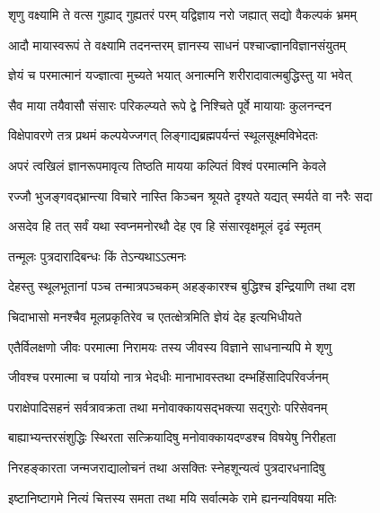 


\addtocounter{shlokacount}{18}

\twolineshloka
{शृणु वक्ष्यामि ते वत्स गुह्याद् गुह्यतरं परम्}
{यद्विज्ञाय नरो जह्यात् सद्यो वैकल्पकं भ्रमम्} %

\twolineshloka
{आदौ मायास्वरूपं ते वक्ष्यामि तदनन्तरम्}
{ज्ञानस्य साधनं पश्चाज्ज्ञानविज्ञानसंयुतम्} %

\twolineshloka
{ज्ञेयं च परमात्मानं यज्ज्ञात्वा मुच्यते भयात्}
{अनात्मनि शरीरादावात्मबुद्धिस्तु या भवेत्} %

\twolineshloka
{सैव माया तयैवासौ संसारः परिकल्प्यते}
{रूपे द्वे निश्चिते पूर्वे मायायाः कुलनन्दन} %

\twolineshloka
{विक्षेपावरणे तत्र प्रथमं कल्पयेज्जगत्}
{लिङ्गाद्यब्रह्मपर्यन्तं स्थूलसूक्ष्मविभेदतः} %

\twolineshloka
{अपरं त्वखिलं ज्ञानरूपमावृत्य तिष्ठति}
{मायया कल्पितं विश्वं परमात्मनि केवले} %

\twolineshloka
{रज्जौ भुजङ्गवद्भ्रान्त्या विचारे नास्ति किञ्चन}
{श्रूयते दृश्यते यद्यत् स्मर्यते वा नरैः सदा} %

\twolineshloka
{असदेव हि तत् सर्वं यथा स्वप्नमनोरथौ}
{देह एव हि संसारवृक्षमूलं दृढं स्मृतम्} %

\onelineshloka
{तन्मूलः पुत्रदारादिबन्धः किं तेऽन्यथाऽऽत्मनः} %


\twolineshloka
{देहस्तु स्थूलभूतानां पञ्च तन्मात्रपञ्चकम्}
{अहङ्कारश्च बुद्धिश्च इन्द्रियाणि तथा दश} %

\twolineshloka
{चिदाभासो मनश्चैव मूलप्रकृतिरेव च}
{एतत्क्षेत्रमिति ज्ञेयं देह इत्यभिधीयते} %

\twolineshloka
{एतैर्विलक्षणो जीवः परमात्मा निरामयः}
{तस्य जीवस्य विज्ञाने साधनान्यपि मे शृणु} %

\twolineshloka
{जीवश्च परमात्मा च पर्यायो नात्र भेदधीः}
{मानाभावस्तथा दम्भहिंसादिपरिवर्जनम्} %

\twolineshloka
{पराक्षेपादिसहनं सर्वत्रावक्रता तथा}
{मनोवाक्कायसद्भक्त्या सद्गुरोः परिसेवनम्} %

\twolineshloka
{बाह्याभ्यन्तरसंशुद्धिः स्थिरता सत्क्रियादिषु}
{मनोवाक्कायदण्डश्च विषयेषु निरीहता} %

\twolineshloka
{निरहङ्कारता जन्मजराद्यालोचनं तथा}
{असक्तिः स्नेहशून्यत्वं पुत्रदारधनादिषु} %

\twolineshloka
{इष्टानिष्टागमे नित्यं चित्तस्य समता तथा}
{मयि सर्वात्मके रामे ह्यनन्यविषया मतिः} %

